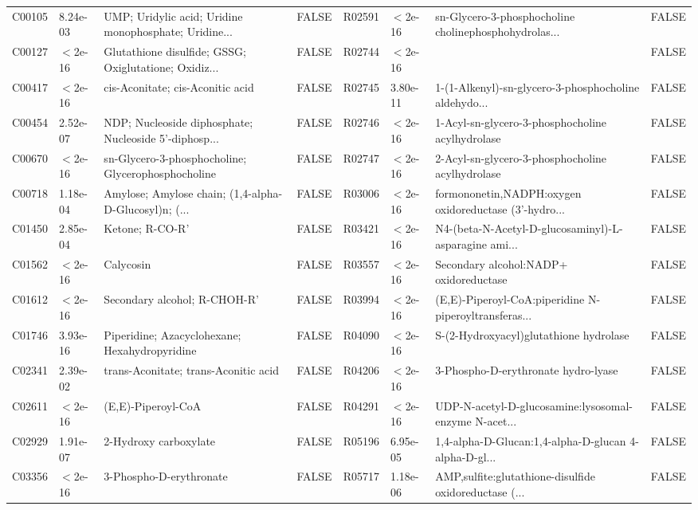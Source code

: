 \documentclass{article}\usepackage[]{graphicx}\usepackage[]{color}
\begin{document}
{{\begin{tabular}{llllllll}
  C00105 &  8.24e-03 & UMP; Uridylic acid; Uridine monophosphate; Uridine... & FALSE & R02591 & $<$2e-16 & sn-Glycero-3-phosphocholine cholinephosphohydrolas... & FALSE \\ 
  C00127 & $<$2e-16 & Glutathione disulfide; GSSG; Oxiglutatione; Oxidiz... & FALSE & R02744 & $<$2e-16 &  & FALSE \\ 
  C00417 & $<$2e-16 & cis-Aconitate; cis-Aconitic acid & FALSE & R02745 &  3.80e-11 & 1-(1-Alkenyl)-sn-glycero-3-phosphocholine aldehydo... & FALSE \\ 
  C00454 &  2.52e-07 & NDP; Nucleoside diphosphate; Nucleoside 5'-diphosp... & FALSE & R02746 & $<$2e-16 & 1-Acyl-sn-glycero-3-phosphocholine acylhydrolase & FALSE \\ 
  C00670 & $<$2e-16 & sn-Glycero-3-phosphocholine; Glycerophosphocholine & FALSE & R02747 & $<$2e-16 & 2-Acyl-sn-glycero-3-phosphocholine acylhydrolase & FALSE \\ 
  C00718 &  1.18e-04 & Amylose; Amylose chain; (1,4-alpha-D-Glucosyl)n; (... & FALSE & R03006 & $<$2e-16 & formononetin,NADPH:oxygen oxidoreductase (3'-hydro... & FALSE \\ 
  C01450 &  2.85e-04 & Ketone; R-CO-R' & FALSE & R03421 & $<$2e-16 & N4-(beta-N-Acetyl-D-glucosaminyl)-L-asparagine ami... & FALSE \\ 
  C01562 & $<$2e-16 & Calycosin & FALSE & R03557 & $<$2e-16 & Secondary alcohol:NADP+ oxidoreductase & FALSE \\ 
  C01612 & $<$2e-16 & Secondary alcohol; R-CHOH-R' & FALSE & R03994 & $<$2e-16 & (E,E)-Piperoyl-CoA:piperidine N-piperoyltransferas... & FALSE \\ 
  C01746 &  3.93e-16 & Piperidine; Azacyclohexane; Hexahydropyridine & FALSE & R04090 & $<$2e-16 & S-(2-Hydroxyacyl)glutathione hydrolase & FALSE \\ 
  C02341 &  2.39e-02 & trans-Aconitate; trans-Aconitic acid & FALSE & R04206 & $<$2e-16 & 3-Phospho-D-erythronate hydro-lyase & FALSE \\ 
  C02611 & $<$2e-16 & (E,E)-Piperoyl-CoA & FALSE & R04291 & $<$2e-16 & UDP-N-acetyl-D-glucosamine:lysosomal-enzyme N-acet... & FALSE \\ 
  C02929 &  1.91e-07 & 2-Hydroxy carboxylate & FALSE & R05196 &  6.95e-05 & 1,4-alpha-D-Glucan:1,4-alpha-D-glucan 4-alpha-D-gl... & FALSE \\ 
  C03356 & $<$2e-16 & 3-Phospho-D-erythronate & FALSE & R05717 &  1.18e-06 & AMP,sulfite:glutathione-disulfide oxidoreductase (... & FALSE \\ 

\end{tabular}}}
\end{document}

